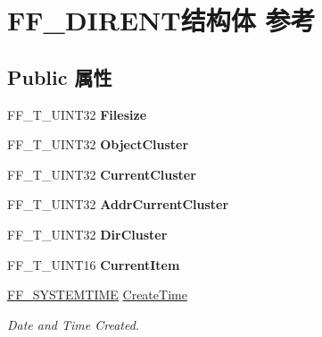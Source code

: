 \hypertarget{struct_f_f___d_i_r_e_n_t}{}\section{F\+F\+\_\+\+D\+I\+R\+E\+N\+T结构体 参考}
\label{struct_f_f___d_i_r_e_n_t}
\subsection*{Public 属性}
\begin{DoxyCompactItemize}
\item 
\mbox{\label{struct_f_f___d_i_r_e_n_t_a483b45c24466b4d3a519c883405403a9}} 
F\+F\+\_\+\+T\+\_\+\+U\+I\+N\+T32 {\bfseries Filesize}
\item 
\mbox{\label{struct_f_f___d_i_r_e_n_t_aa026db1e84b20e4e1bb1aa884c1448ca}} 
F\+F\+\_\+\+T\+\_\+\+U\+I\+N\+T32 {\bfseries Object\+Cluster}
\item 
\mbox{\label{struct_f_f___d_i_r_e_n_t_a63f3b1811aaec8649dfca9ad62c4a35b}} 
F\+F\+\_\+\+T\+\_\+\+U\+I\+N\+T32 {\bfseries Current\+Cluster}
\item 
\mbox{\label{struct_f_f___d_i_r_e_n_t_ad3e56e1e4c5abebbd5f3061ddbeb43bc}} 
F\+F\+\_\+\+T\+\_\+\+U\+I\+N\+T32 {\bfseries Addr\+Current\+Cluster}
\item 
\mbox{\label{struct_f_f___d_i_r_e_n_t_a36f356cfc65ef974c2c8a074e6edb62d}} 
F\+F\+\_\+\+T\+\_\+\+U\+I\+N\+T32 {\bfseries Dir\+Cluster}
\item 
\mbox{\label{struct_f_f___d_i_r_e_n_t_a3ab2ebfe3b21214eb2eb7e9bfa8f7b7c}} 
F\+F\+\_\+\+T\+\_\+\+U\+I\+N\+T16 {\bfseries Current\+Item}
\item 
\mbox{\label{struct_f_f___d_i_r_e_n_t_ab725f5b72c8b86e35eb943ff5c111e8d}} 
\hyperlink{struct_f_f___s_y_s_t_e_m_t_i_m_e}{F\+F\+\_\+\+S\+Y\+S\+T\+E\+M\+T\+I\+ME} \hyperlink{struct_f_f___d_i_r_e_n_t_ab725f5b72c8b86e35eb943ff5c111e8d}{Create\+Time}
\begin{DoxyCompactList}\small\item\em Date and Time Created. \end{DoxyCompactList}\item 

\end{DoxyCompactItemize}
